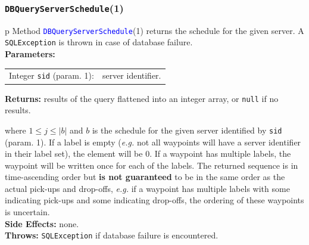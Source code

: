 \documentclass{article}
\theoremstyle{definition}                   %
\begin{document}
\subsubsection{{\tt{}\protect{}DBQueryServerSchedule}(1)}
\begin{tabular}{p{\textwidth}}
\toprule
{}
Method \textcolor{blue}{{\tt{}\protect{}DBQueryServerSchedule}}(1) returns the schedule
for the given server.
A {\tt{}SQLException} is thrown in case of database failure.\\
\midrule
\textbf{Parameters:} \\
\begin{tabular}{lp{116mm}}
Integer {\tt{}sid} (param. 1):&server identifier.\\
\end{tabular}
\textbf{Returns:} results of the query flattened into an integer array,
or {\tt{}null} if no results.


where $1\leq j\leq |b|$ and $b$ is the schedule for the
given server  identified by {\tt{}sid} (param. 1).
If a label is empty (\textit{e.g.} not all waypoints will have a server
identifier in their label set), the element will be 0. If a waypoint has
multiple labels, the waypoint will be written once for each of the labels.
The returned sequence is in time-ascending order but \textbf{is not guaranteed}
to be in the same order as the actual pick-ups and drop-offs, \textit{e.g.} if a
waypoint has multiple labels with some indicating pick-ups and some indicating
drop-offs, the ordering of these waypoints is uncertain.\\
\textbf{Side Effects:} none.\\
\textbf{Throws:} {\tt{}SQLException} if database failure is encountered.\\
\bottomrule
\end{tabular}
\nwenddocs{}\endmoddef{}
\end{document}
